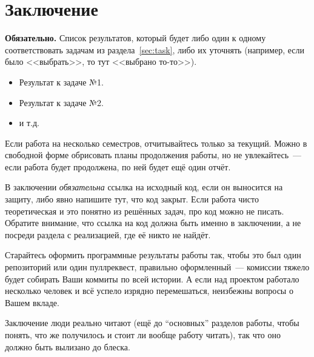 
\section*{Заключение}
\textbf{Обязательно.}
Список результатов, который будет либо один к одному соответствовать задачам из раздела~\ref{sec:task}, либо их уточнять (например, если было <<выбрать>>, то тут <<выбрано то-то>>).

\begin{itemize}
    \item Результат к задаче №1.
    \item Результат к задаче №2.
    \item и т.д.
\end{itemize}
\noindent Если работа на несколько семестров, отчитывайтесь только за текущий.
Можно в свободной форме обрисовать планы продолжения работы, но не увлекайтесь~--- если работа будет продолжена, по ней будет ещё один отчёт.

В заключении \emph{обязательна} ссылка на исходный код, если он выносится на защиту, либо явно напишите тут, что код закрыт.
Если работа чисто теоретическая и это понятно из решённых задач, про код можно не писать.
Обратите внимание, что ссылка на код должна быть именно в заключении, а не посреди раздела с реализацией, где её никто не найдёт.

Старайтесь оформить программные результаты работы так, чтобы это был один репозиторий или один пуллреквест, правильно оформленный~--- комиссии тяжело будет собирать Ваши коммиты по всей истории.
А если над проектом работало несколько человек и всё успело изрядно перемешаться, неизбежны вопросы о Вашем вкладе.

Заключение люди реально читают (ещё до \enquote{основных} разделов работы, чтобы понять, что же получилось и стоит ли вообще работу читать), так что оно должно быть вылизано до блеска.
